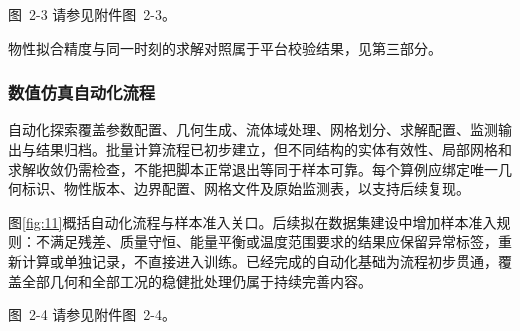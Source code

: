 \documentclass[UTF8]{midterm}
\makeatletter
\newcommand{\submissionnumber}[1]{\def\@currentlabel{#1}}
\makeatother
\begin{document}
\par\noindent \begingroup\submissionnumber{2-3}\label{fig:udf-interface}\endgroup 图~2-3 请参见附件图~2-3。\par


物性拟合精度与同一时刻的求解对照属于平台校验结果，见第三部分。

\subsubsection{数值仿真自动化流程}
自动化探索覆盖参数配置、几何生成、流体域处理、网格划分、求解配置、监测输出与结果归档。批量计算流程已初步建立，但不同结构的实体有效性、局部网格和求解收敛仍需检查，不能把脚本正常退出等同于样本可靠。每个算例应绑定唯一几何标识、物性版本、边界配置、网格文件及原始监测表，以支持后续复现。

图\ref{fig:11}概括自动化流程与样本准入关口。后续拟在数据集建设中增加样本准入规则：不满足残差、质量守恒、能量平衡或温度范围要求的结果应保留异常标签，重新计算或单独记录，不直接进入训练。已经完成的自动化基础为流程初步贯通，覆盖全部几何和全部工况的稳健批处理仍属于持续完善内容。

\par\noindent \begingroup\submissionnumber{2-4}\label{fig:11}\endgroup 图~2-4 请参见附件图~2-4。\par
\end{document}
